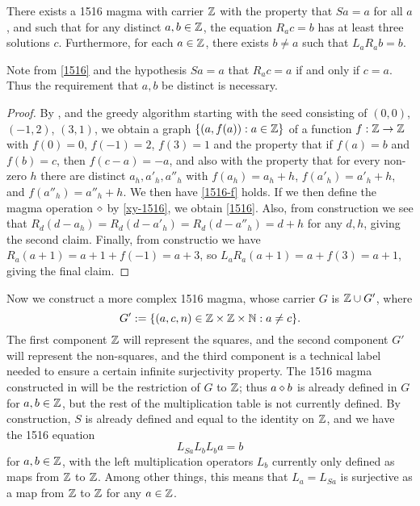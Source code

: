 \begin{corollary}\label{1516-base} There exists a 1516 magma with carrier $\mathbb{Z}$ with the property that $Sa=a$ for all $a$, and such that for any distinct $a,b \in \mathbb{Z}$, the equation $R_a c = b$ has at least three solutions $c$.  Furthermore, for each $a \in \mathbb{Z}$, there exists $b \neq a$ such that $L_a R_a b = b$.
\end{corollary}

Note from \eqref{1516} and the hypothesis $Sa=a$ that $R_a c = a$ if and only if $c=a$.  Thus the requirement that $a,b$ be distinct is necessary.

\begin{proof}  By ,  and the greedy algorithm starting with the seed consisting of $(0,0)$, $(-1,2)$, $(3,1)$, we obtain a graph $\{ (a,f(a)): a \in \mathbb{Z} \}$ of a function $f:\mathbb{Z} \to \mathbb{Z}$ with $f(0)=0$, $f(-1)=2$, $f(3)=1$ and the property that if $f(a)=b$ and $f(b)=c$, then $f(c-a)=-a$, and also with the property that for every non-zero $h$ there are distinct $a_h, a'_h, a''_h$ with $f(a_h)=a_h+h$, $f(a'_h) = a'_h+h$, and $f(a''_h) = a''_h+h$.  We then have \eqref{1516-f} holds.  If we then define the magma operation $\diamond$ by \eqref{xy-1516}, we obtain \eqref{1516}.  Also, from construction we see that $R_d (d - a_h) = R_d (d - a'_h) = R_d (d - a''_h) = d+h$ for any $d,h$, giving the second claim.  Finally, from constructio we have $R_a (a+1) = a+1+f(-1) = a+3$, so $L_a R_a (a+1) = a + f(3) = a+1$, giving the final claim.
\end{proof}

Now we construct a more complex 1516 magma, whose carrier $G$ is $\mathbb{Z} \cup G'$, where
$$G' := \{ (a,c,n) \in \mathbb{Z} \times \mathbb{Z} \times \mathbb{N} : a \neq c\}.$$
The first component $\mathbb{Z}$ will represent the squares, and the second component $G'$ will represent the non-squares, and the third component is a technical label needed to ensure a certain infinite surjectivity property.  The 1516 magma constructed in  will be the restriction of $G$ to $\mathbb{Z}$; thus $a \diamond b$ is already defined in $G$ for $a,b \in \mathbb{Z}$, but the rest of the multiplication table is not currently defined.  By construction, $S$ is already defined and equal to the identity on $\mathbb{Z}$, and we have the 1516 equation
$$ L_{Sa} L_b L_b a = b$$
for $a,b \in \mathbb{Z}$, with the left multiplication operators $L_b$ currently only defined as maps from $\mathbb{Z}$ to $\mathbb{Z}$.  Among other things, this means that $L_a = L_{Sa}$ is surjective as a map from $\mathbb{Z}$ to $\mathbb{Z}$ for any $a \in \mathbb{Z}$.

